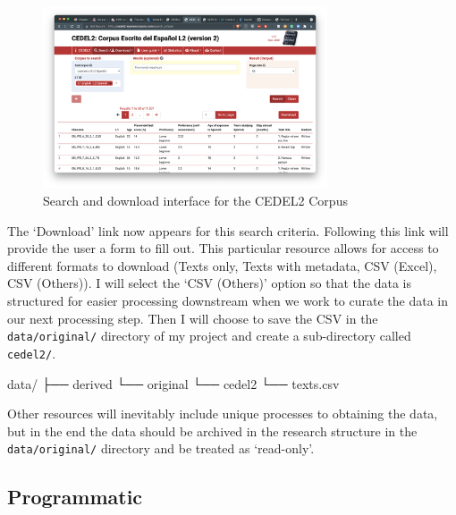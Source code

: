 \documentclass[
  letterpaper,
]{latex/krantz}
\newenvironment{Shaded}{\begin{snugshade}}{\end{snugshade}}
\newcommand{\ExtensionTok}[1]{\textcolor[rgb]{0.00,0.00,0.00}{#1}}
\newcommand{\NormalTok}[1]{\textcolor[rgb]{0.00,0.00,0.00}{#1}}
\begin{document}
\begin{figure}[h]

{\centering \includegraphics[width=0.75\textwidth,height=\textheight]{figures/acquire-data/ad-cedel2-search-download.png}

}

\caption{\label{fig-ad-show-page-cedel2-2}Search and download interface
for the CEDEL2 Corpus}

\end{figure}

The `Download' link now appears for this search criteria. Following this
link will provide the user a form to fill out. This particular resource
allows for access to different formats to download (Texts only, Texts
with metadata, CSV (Excel), CSV (Others)). I will select the `CSV
(Others)' option so that the data is structured for easier processing
downstream when we work to curate the data in our next processing step.
Then I will choose to save the CSV in the \texttt{data/original/}
directory of my project and create a sub-directory called
\texttt{cedel2/}.

\begin{Shaded}
\begin{Highlighting}[]
\ExtensionTok{data/}
\ExtensionTok{├──}\NormalTok{ derived}
\ExtensionTok{└──}\NormalTok{ original}
    \ExtensionTok{└──}\NormalTok{ cedel2}
       \ExtensionTok{└──}\NormalTok{ texts.csv}
\end{Highlighting}
\end{Shaded}

Other resources will inevitably include unique processes to obtaining
the data, but in the end the data should be archived in the research
structure in the \texttt{data/original/} directory and be treated as
`read-only'.

\hypertarget{programmatic}{%
\subsection{Programmatic}\label{programmatic}}
\end{document}

